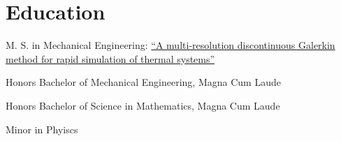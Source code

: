 \section{Education}
%
\begin{position}
  \begin{myitem}
  \item M. S. in Mechanical Engineering: \href{https://smartech.gatech.edu/bitstream/handle/1853/42775/gempesaw_daniel_j_201112_mast.pdf?sequence=1p}{``A multi-resolution discontinuous Galerkin method for rapid simulation of thermal systems''}
  \end{myitem}
  \begin{myitem}
  \item Honors Bachelor of Mechanical Engineering, Magna Cum Laude
  \item Honors Bachelor of Science in Mathematics, Magna Cum Laude
  \item Minor in Phyiscs
  \end{myitem}
\end{position}
